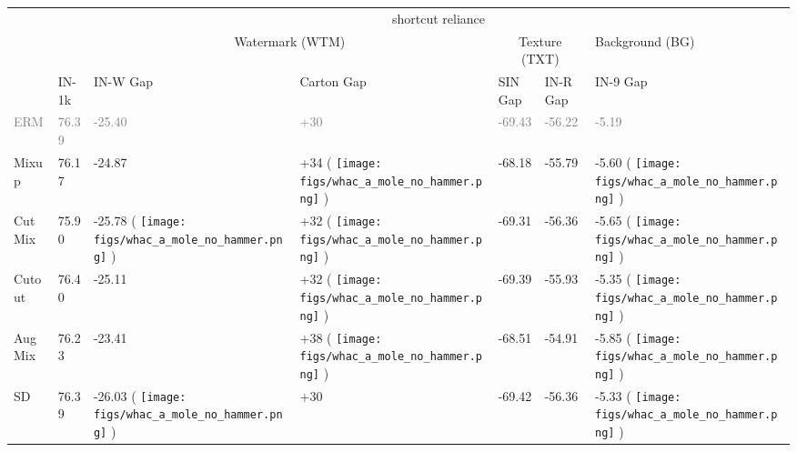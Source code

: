 \documentclass[10pt,twocolumn,letterpaper]{article}
\DeclareRobustCommand{\molenohammer}{\begingroup\normalfont
  \texttt{[image: figs/whac\_a\_mole\_no\_hammer.png]}\endgroup
}
\begin{document}
\begin{table}[t]
\centering
\begin{adjustbox}{width=\linewidth}
\begin{tabular}{@{}lllllll@{}}
\toprule
                          & \multicolumn{1}{l|}{}      & \multicolumn{5}{c}{shortcut reliance}                                                                                                                                 \\ \cmidrule(l){3-7}
             & \multicolumn{1}{l|}{}      & \multicolumn{2}{c|}{Watermark (WTM)}                                     & \multicolumn{2}{c|}{Texture (TXT)}                                             & Background (BG)            \\
                           & \multicolumn{1}{l|}{IN-1k} & IN-W Gap  & \multicolumn{1}{l|}{Carton Gap } & SIN Gap             & \multicolumn{1}{l|}{IN-R Gap } & IN-9 Gap    \\ \midrule
\textcolor{gray}{ERM}        & \textcolor{gray}{76.39}       & \textcolor{gray}{-25.40}     & \textcolor{gray}{+30}      & \textcolor{gray}{-69.43}         & \textcolor{gray}{-56.22}        & \textcolor{gray}{-5.19}                \\ \midrule
Mixup                           & 76.17                & -24.87               & +34 \footnotesize{(\textcolor{red}{} \molenohammer)}               & -68.18               & -55.79               & -5.60  \footnotesize{(\textcolor{red}{} \molenohammer)}             \\
CutMix                          & 75.90                & -25.78 \footnotesize{(\textcolor{red}{} \molenohammer)}             & +32 \footnotesize{(\textcolor{red}{} \molenohammer)}                 & -69.31               & -56.36               & -5.65 \footnotesize{(\textcolor{red}{} \molenohammer)}             \\
Cutout                      & 76.40                & -25.11               & +32 \footnotesize{(\textcolor{red}{} \molenohammer)}                 & -69.39               & -55.93               & -5.35   \footnotesize{(\textcolor{red}{} \molenohammer)}         \\
AugMix                      & 76.23                & -23.41               & +38  \footnotesize{(\textcolor{red}{} \molenohammer)}                & -68.51               & -54.91               & -5.85 \footnotesize{(\textcolor{red}{} \molenohammer)}              \\
SD                    & 76.39                & -26.03 \footnotesize{(\textcolor{red}{} \molenohammer)}               & +30                  & -69.42               & -56.36      & -5.33  \footnotesize{(\textcolor{red}{} \molenohammer)}              \\ \midrule

\end{tabular}
\end{adjustbox}
\end{table}
\end{document}

